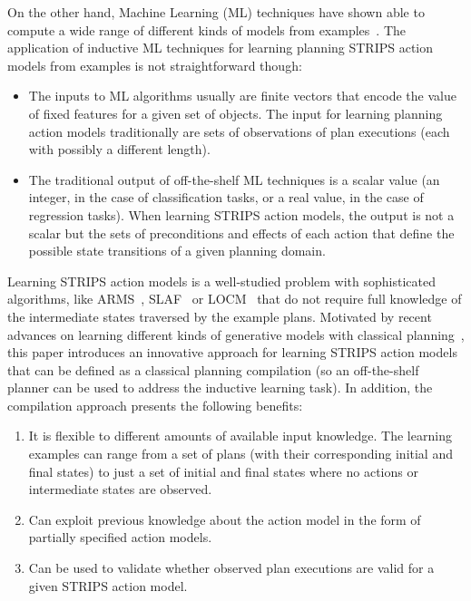 \documentclass[letterpaper]{article} %
\begin{document}
On the other hand, Machine Learning (ML) techniques have shown able to compute a wide range of different kinds of models from examples~\cite{michalski2013machine}. The application of inductive ML techniques for learning planning STRIPS action models from examples is not straightforward though:
\begin{itemize}
\item The inputs to ML algorithms usually are finite vectors that encode the value of fixed features for a given set of objects. The input for learning planning action models traditionally are sets of observations of plan executions (each with possibly a different length).
\item The traditional output of off-the-shelf ML techniques is a scalar value (an integer, in the case of classification tasks, or a real value, in the case of regression tasks). When learning STRIPS action models, the output is not a scalar but the sets of preconditions and effects of each action that define the possible state transitions of a given planning domain. 
\end{itemize}

Learning STRIPS action models is a well-studied problem with sophisticated algorithms, like {\sc ARMS}~\cite{yang2007learning}, {\sc SLAF}~\cite{amir:alearning:JAIR08} or {\sc LOCM}~\cite{cresswell2013acquiring} that do not require full knowledge of the intermediate states traversed by the example plans. Motivated by recent advances on learning different kinds of generative models with classical planning~\cite{bonet2009automatic,segovia2016hierarchical,segovia2017generating}, this paper introduces an innovative approach for learning STRIPS action models that can be defined as a classical planning compilation (so an off-the-shelf planner can be used to address the inductive learning task). In addition, the compilation approach presents the following benefits:
\begin{enumerate}
\item It is flexible to different amounts of available input knowledge. The learning examples can range from a set of plans (with their corresponding initial and final states) to just a set of initial and final states where no actions or intermediate states are observed.
\item Can exploit previous knowledge about the action model in the form of partially specified action models.
\item Can be used to validate whether observed plan executions are valid for a given STRIPS action model.
\end{enumerate}
\end{document}
